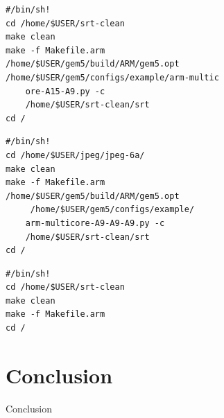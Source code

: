 \documentclass[journal]{IEEEtran}
\begin{document}
\begin{lstlisting}
#/bin/sh!
cd /home/$USER/srt-clean
make clean
make -f Makefile.arm
/home/$USER/gem5/build/ARM/gem5.opt
/home/$USER/gem5/configs/example/arm-multic
	ore-A15-A9.py -c
	/home/$USER/srt-clean/srt
cd /
\end{lstlisting}

\begin{lstlisting}
#/bin/sh!
cd /home/$USER/jpeg/jpeg-6a/
make clean
make -f Makefile.arm
/home/$USER/gem5/build/ARM/gem5.opt
	 /home/$USER/gem5/configs/example/
	arm-multicore-A9-A9-A9.py -c 
	/home/$USER/srt-clean/srt
cd /
\end{lstlisting}


\begin{lstlisting}
#/bin/sh!
cd /home/$USER/srt-clean
make clean
make -f Makefile.arm
cd /
\end{lstlisting}



\section{Conclusion}
Conclusion
\end{document}
